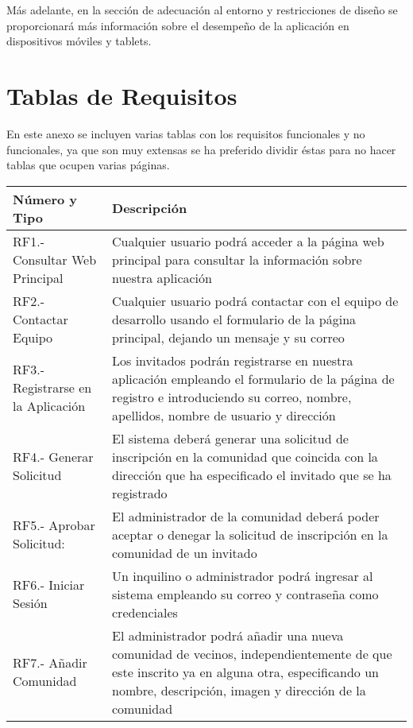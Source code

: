 \begin{appendices}
Más adelante, en la sección de adecuación al entorno y restricciones de diseño se proporcionará más información sobre el desempeño de la aplicación en dispositivos móviles y tablets.

\newpage

\section{Tablas de Requisitos}
\label{sec:apenB}
En este anexo se incluyen varias tablas con los requisitos funcionales y no funcionales, ya que son muy extensas se ha preferido dividir éstas para no hacer tablas que ocupen varias páginas.

\begin{table}[H]
	\begin{center}
		\bgroup
		\def\arraystretch{1.5}
		\begin{tabular}{| p{5cm} | p{10cm} |}
			\hline
			\textbf{Número y Tipo} & \textbf{Descripción}  \\ \hline
			RF1.- Consultar Web Principal &  Cualquier usuario podrá acceder a la página web principal para consultar la información sobre nuestra aplicación \\ \hline
			RF2.- Contactar Equipo & Cualquier usuario podrá contactar con el equipo de desarrollo usando
			el formulario de la página principal, dejando un mensaje y su correo \\ \hline
			RF3.- Registrarse en la Aplicación & Los invitados podrán registrarse en nuestra aplicación empleando el formulario de la página de registro e introduciendo su correo, nombre, apellidos, nombre
			de usuario y dirección  \\ \hline
			RF4.- Generar Solicitud & El sistema deberá generar una solicitud de inscripción en la comunidad que coincida con la dirección que ha especificado el invitado que se ha registrado  \\ \hline
			RF5.- Aprobar Solicitud: & El administrador de la comunidad deberá poder aceptar o denegar la
			solicitud de inscripción en la comunidad de un invitado  \\ \hline
			RF6.- Iniciar Sesión & Un inquilino o administrador podrá ingresar al sistema empleando su correo
			y contraseña como credenciales  \\ \hline
			RF7.- Añadir Comunidad & El administrador podrá añadir una nueva comunidad de vecinos, independientemente de que 
			este inscrito ya en alguna otra, especificando un nombre, descripción, imagen y dirección de la comunidad  \\ \hline

\end{tabular}
\end{center}
\end{table}
\end{appendices}
